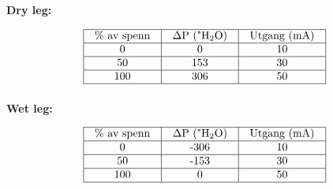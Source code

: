 





{\bf Dry leg:}


$$\vbox{\offinterlineskip
\halign{\strut
\vrule \quad\hfil # \ \hfil & 
\vrule \quad\hfil # \ \hfil & 
\vrule \quad\hfil # \ \hfil \vrule \cr
\noalign{\hrule}
%
\% av spenn & $\Delta$P ("H$_{2}$O) & Utgang (mA) \cr
%
\noalign{\hrule}
%
0 & 0 & 10 \cr
%
\noalign{\hrule}
%
50 & 153 & 30 \cr
%
\noalign{\hrule}
%
100 & 306 & 50 \cr
%
\noalign{\hrule}
} %
}$$ %

\vskip 10pt

{\bf Wet leg:}


$$\vbox{\offinterlineskip
\halign{\strut
\vrule \quad\hfil # \ \hfil & 
\vrule \quad\hfil # \ \hfil & 
\vrule \quad\hfil # \ \hfil \vrule \cr
\noalign{\hrule}
%
\% av spenn & $\Delta$P ("H$_{2}$O) & Utgang (mA) \cr
%
\noalign{\hrule}
%
0 & -306 & 10 \cr
%
\noalign{\hrule}
%
50 & -153 & 30 \cr
%
\noalign{\hrule}
%
100 & 0 & 50 \cr
%
\noalign{\hrule}
} %
}$$ %









